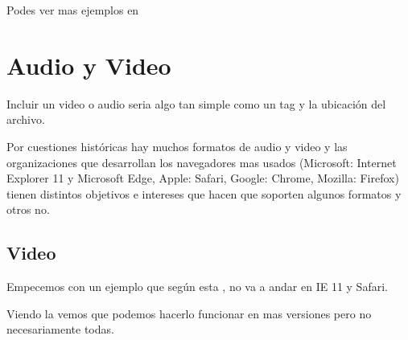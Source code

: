 \documentclass[letterpaper,10pt,spanish]{sphinxmanual}
\begin{document}
Podes ver mas ejemplos en 


\chapter{Audio y Video}
\label{\detokenize{audio-y-video::doc}}\label{\detokenize{audio-y-video:audio-y-video}}
Incluir un video o audio seria algo tan simple como un tag y la ubicación del
archivo.

Por cuestiones históricas hay muchos formatos de audio y video y las
organizaciones que desarrollan los navegadores mas usados (Microsoft: Internet
Explorer 11 y Microsoft Edge, Apple: Safari, Google: Chrome, Mozilla: Firefox)
tienen distintos objetivos e intereses que hacen que soporten algunos formatos
y otros no.


\section{Video}
\label{\detokenize{audio-y-video:video}}
Empecemos con un ejemplo que según esta , no va a andar en IE 11 y Safari.

%
\begin{sphinxVerbatim}[commandchars=\\\{\}]
   
\end{sphinxVerbatim}



Viendo la  vemos que podemos hacerlo funcionar en mas versiones pero no necesariamente todas.

%
\begin{sphinxVerbatim}[commandchars=\\\{\}]
   
\end{sphinxVerbatim}
\end{document}
